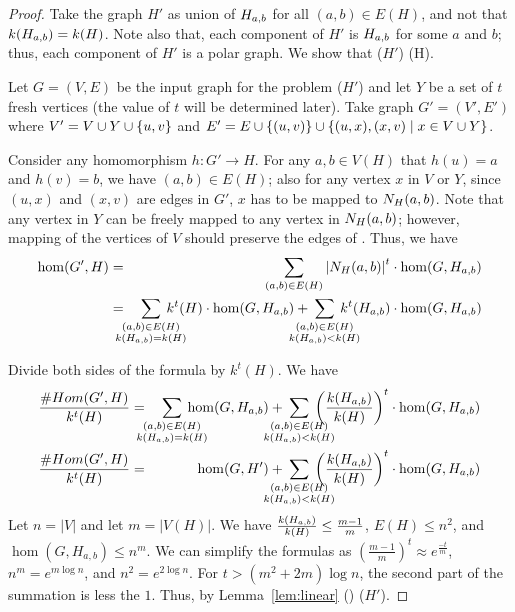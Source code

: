 \begin{proof}
Take the graph \(H'\) as union of \(H_{a,b}\) for all \((a,b)\in E(H)\), and
not that \(k(H_{a,b})=k(H)\)\@. Note also that, each component of \(H'\) is \(H_{a,b}\) for 
some \(a\) and \(b\); thus, each component of \(H'\) is a polar graph.
We show that \chom(\(H'\)) \maple \chom(H)\@.

Let \(G=(V,E)\) be the input graph for the problem \chom(\(H'\)) 
and let \(Y\) be a set of \(t\) fresh vertices
(the value of \(t\) will be determined later). Take graph \(G'=(V',E')\) where
\(V'=V \cup Y \cup \{{u,v}\}\) and \(E'=E \cup \{{(u,v)}\} \cup
\{{(u,x),(x,v) \mid x\in V \cup Y}\}\)\@.

Consider any homomorphism \(h: G'\to H\)\@.
For any \(a,b\in V(H)\) that \(h(u)=a\) and \(h(v)=b\), we have \((a,b)\in E(H)\); also
for any vertex \(x\) in \(V\) or \(Y\), since \((u,x)\) and \((x,v)\) are edges in \(G'\), 
\(x\) has to be mapped to \(N_{H}({a},{b})\)\@. Note that any vertex in \(Y\) can be freely mapped
to any vertex in \(N_{H}({a},{b})\); however, mapping of the vertices of \(V\) should preserve the edges 
of \mG\@. Thus, we have
\begin{eqnarray*}
\hom(G',H) &=&  
\sum_{(a,b)\in E(H)}\left|\NHab Hab\right|^ t \cdot
\hom(G,\Hab)\\
&=& 
\bigsum{\substack{(a,b)\in E(H) \\
\magf(H_{a,b})=\magf(H)}} 
\magf^t(H) \cdot \hom(G,H_{a,b})+
\bigsum{\substack{(a,b)\in E(H) \\ \magf(H_{a,b}) < \magf(H)}}k^t
(H_{a,b})\cdot \hom(G,H_{a,b})
\end{eqnarray*}

Divide both sides of the formula by \(k^t(H)\)\@. We have
\begin{eqnarray*}
\frac{\chom(G',H)}{\magf^t(H)} &=& 
\bigsum{\substack{(a,b)\in E(H) \\ \magf(H_{a,b})=\magf(H)}} 
\hom(G,H_{a,b}) + 
\bigsum{\substack{(a,b)\in E(H) \\ \magf(H_{a,b})<\magf(H)}}
\left(\frac{\magf(H_{a,b})}{\magf(H)} \right )^t
\cdot\hom(G,H_{a,b})\\
\frac{\chom(G',H)}{\magf^t(H)} &=& 
\hom(G,H') + \bigsum{\substack{(a,b)\in E(H) \\ \magf(H_{a,b})<\magf(H)}}
\left(\frac{\magf(H_{a,b})}{\magf(H)} \right )^t
\cdot\hom(G,H_{a,b})\\
\end{eqnarray*}
Let \(n=|V|\) and let \(m=|V(H)|\). We have \(\frac{k(H_{a,b})}{k(H)} \le \frac{m-1}{m}\),
\(E(H)\le n^2\), and \(\hom(G,H_{a,b}) \le n^m\).
We can simplify the formulas as \((\frac{m-1}{m})^t \approx e^{\frac{-t}{m}}\),
\(n^m = e^{m\log n}\), and \(n^2 = e^{2\log n}\).
For \(t > (m^2+2m) \log n\), the second part of the summation is less the \(1\).
Thus, by Lemma~\ref{lem:linear} \chom(\mH) \mapge \chom(\(H'\)).
\end{proof}

